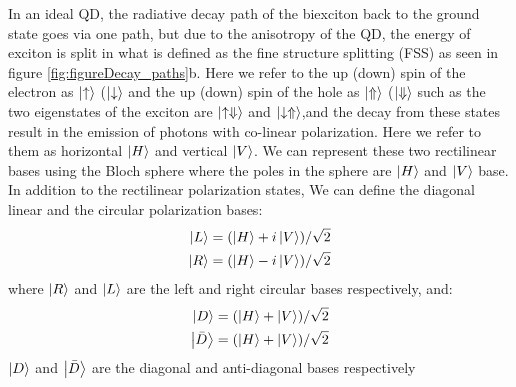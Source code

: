 	In an ideal QD, the radiative decay path of the biexciton back to the ground state goes via one path, but due to the anisotropy of the QD, the energy of exciton is split in what is defined as the fine structure splitting (FSS) as seen in figure \ref{fig:figureDecay_paths}b. Here we refer to the up (down) spin of the electron as $\ket{\uparrow}$ ($\ket{\downarrow}$ and the up (down) spin of the hole as $\ket{\Uparrow}$ ($\ket{\Downarrow}$ such as the two eigenstates of the exciton are  $\ket{\uparrow\Downarrow}$ and $\ket{\downarrow\Uparrow}$,and the decay from these states result in the emission of photons with co-linear polarization. Here we refer to them as horizontal $\ket{H}$ and vertical $\ket{V}$. We can represent these two rectilinear bases using the Bloch sphere where the poles in the sphere are $\ket{H}$ and $\ket{V}$ base.\\
	
	In addition to the rectilinear polarization states, We can define the diagonal linear and
	the circular polarization bases: 
	\begin{equation}
		\begin{split}
			\ket{L}=(\ket{H}+i\ket{V})/\sqrt{2} \\
			\ket{R}=(\ket{H}-i\ket{V})/\sqrt{2}
		\end{split}
	\end{equation}
	where $\ket{R}$ and $\ket{L}$ are the left and right circular bases respectively, and:
	\begin{equation}
		\begin{split}
			\ket{D}=(\ket{H}+\ket{V})/\sqrt{2}\\
			\ket{\bar{D}}=(\ket{H}+\ket{V})/\sqrt{2}
		\end{split}
	\end{equation}
	$\ket{D}$ and $\ket{\bar{D}}$ are the diagonal and anti-diagonal bases respectively
	
